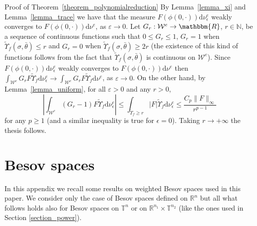 \documentclass[a4paper,10pt]{article}
\newcommand{\mathd}{\mathrm{d}}
\newenvironment{proof*}[1]{\noindent\textbf{#1\ }}{\hspace*{\fill}$\Box$\medskip}
\begin{document}
\begin{proof*}{Proof of Theorem~\ref{theorem_polynomialreduction}}
  By Lemma~\ref{lemma_xi} and Lemma~\ref{lemma_trace} we have that the measure
  $F (\phi (0, \cdot)) \mathd \nu_{\epsilon}^e$ weakly converges to $F (\phi
  (0, \cdot)) \mathd \nu^e$, as $\varepsilon \rightarrow 0$. Let $G_r :
  \mathcal{W}^e \rightarrow \mathbbm{R}$, $r \in \mathbb{N}$, be a sequence of
  continuous functions such that $0 \leqslant G_r \leqslant 1$, $G_r = 1$ when
  $\tilde{\Upsilon}_f (\sigma, \bar{\theta}) \leqslant r$ and $G_r = 0$ when
  $\tilde{\Upsilon}_f (\sigma, \bar{\theta}) \geqslant 2 r$ (the existence of
  this kind of functions follows from the fact that $\tilde{\Upsilon}_f
  (\sigma, \bar{\theta})$ is continuous on $\mathcal{W}^e$). Since $F (\phi
  (0, \cdot)) \mathd \nu_{\epsilon}^e$ weakly converges to $F (\phi (0,
  \cdot)) \mathd \nu^e$ then $\int_{\mathcal{W}^e} G_r F \tilde{\Upsilon}_f
  \mathd \nu^e_{\epsilon} \rightarrow \int_{\mathcal{W}^e} G_r F
  \tilde{\Upsilon}_f \mathd \nu^e$, as $\varepsilon \rightarrow 0$. On the
  other hand, by Lemma~\ref{lemma_uniform}, for all $\varepsilon > 0$ and any
  $r > 0$,
  \[ \left| \int_{\mathcal{W}^e} (G_r - 1) F \tilde{\Upsilon}_f \mathd
     \nu^e_{\epsilon} \right| \leqslant \int_{\tilde{\Upsilon}_f \geqslant r}
     | F | \tilde{\Upsilon}_f \mathd \nu^e_{\epsilon} \leqslant \frac{C_p \| F
     \|_{\infty}}{r^{p - 1}} \]
  for any $p \geq 1$ (and a similar inequality is true for $\epsilon = 0$).
  Taking $r \rightarrow + \infty$ the thesis follows.
\end{proof*}

\appendix\section{Besov spaces}\label{appendix_besov}

In this appendix we recall some results on weighted Besov spaces used in this
paper. We consider only the case of Besov spaces defined on $\mathbb{R}^n$ but
all what follows holds also for Besov spaces on $\mathbb{T}^n$ or on
$\mathbb{R}^{n_1} \times \mathbb{T}^{n_2}$ (like the ones used in Section
\ref{section_power}).

\
\end{document}
